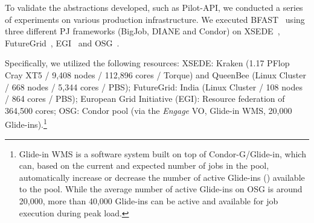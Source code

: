\documentclass[conference]{IEEEtran}
\begin{document}
To validate the abstractions developed,
such as Pilot-API, we conducted a series of
experiments on various production infrastructure. We executed
BFAST~\cite{bfast2009} using three different PJ frameworks (BigJob,
DIANE and Condor) on XSEDE~\cite{xsede}, FutureGrid~\cite{fg},
EGI~\cite{egi} and OSG~\cite{1742-6596-78-1-012057}.

Specifically, we utilized the following resources: XSEDE: Kraken (1.17
PFlop Cray XT5 / 9,408 nodes / 112,896 cores / Torque) and QueenBee
(Linux Cluster / 668 nodes / 5,344 cores / PBS); FutureGrid:
India (Linux Cluster / 108 nodes / 864 cores / PBS); European Grid
Initiative (EGI): Resource federation of 364,500 cores;
OSG: Condor pool (via the \textit{Engage} VO, Glide-in WMS,
20,000 Glide-ins).\footnote{Glide-in WMS is a software system built on
top of Condor-G/Glide-in, which can, based on the current and expected
number of jobs in the pool,  automatically increase or decrease the
number of active Glide-ins (\pilots) available to the pool.  While the
average number of active Glide-ins on OSG is around 20,000, more than
40,000 Glide-ins can be active and available for job execution during
peak load.}

 


\end{document}
